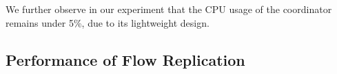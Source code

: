 We further observe in our experiment that the CPU usage of the coordinator remains under 5\%, due to its lightweight design.


\subsection{Performance of Flow Replication}
\label{sec:rp}

